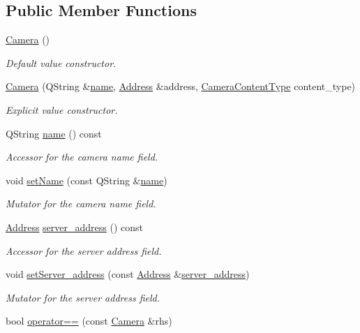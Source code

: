 \subsection*{Public Member Functions}
\begin{DoxyCompactItemize}
\item 
\hyperlink{classCamera_a01f94c3543f56ede7af49dc778f19331}{Camera} ()
\begin{DoxyCompactList}\small\item\em Default value constructor. \end{DoxyCompactList}\item 
\hyperlink{classCamera_a5a4ceda635ed01219348078adddb141b}{Camera} (Q\-String \&\hyperlink{classCamera_a5763757e8d6adb6437dde2502072a3b1}{name}, \hyperlink{classAddress}{Address} \&address, \hyperlink{camera_8h_a10395294162cb49637e9c8f6efdb10ea}{Camera\-Content\-Type} content\-\_\-type)
\begin{DoxyCompactList}\small\item\em Explicit value constructor. \end{DoxyCompactList}\item 
Q\-String \hyperlink{classCamera_a5763757e8d6adb6437dde2502072a3b1}{name} () const 
\begin{DoxyCompactList}\small\item\em Accessor for the camera name field. \end{DoxyCompactList}\item 
void \hyperlink{classCamera_a4f009de64587caa5e2a91a2cdd18fd32}{set\-Name} (const Q\-String \&\hyperlink{classCamera_a5763757e8d6adb6437dde2502072a3b1}{name})
\begin{DoxyCompactList}\small\item\em Mutator for the camera name field. \end{DoxyCompactList}\item 
\hyperlink{classAddress}{Address} \hyperlink{classCamera_aa93654bec9b65adfb95e192ac9c71e80}{server\-\_\-address} () const 
\begin{DoxyCompactList}\small\item\em Accessor for the server address field. \end{DoxyCompactList}\item 
void \hyperlink{classCamera_a678d67d964307ffc9e323d74c7a28ca1}{set\-Server\-\_\-address} (const \hyperlink{classAddress}{Address} \&\hyperlink{classCamera_aa93654bec9b65adfb95e192ac9c71e80}{server\-\_\-address})
\begin{DoxyCompactList}\small\item\em Mutator for the server address field. \end{DoxyCompactList}\item 
bool \hyperlink{classCamera_a1b7b69303090eb7557713a6dda3d3de4}{operator==} (const \hyperlink{classCamera}{Camera} \&rhs)
\end{DoxyCompactItemize}


